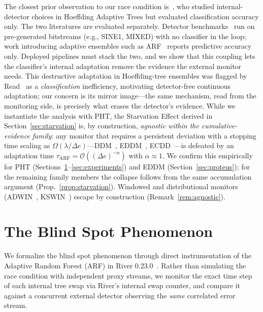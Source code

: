 \documentclass[10pt,conference]{IEEEtran}
\theoremstyle{definition}
\begin{document}
The closest prior observation to our race condition is~\cite{stirling_2018}, who studied internal-detector choices in Hoeffding Adaptive Trees but evaluated classification accuracy only.
The two literatures are evaluated separately. Detector benchmarks~\cite{goncalves_2014, lukats_2025} run on pre-generated bitstreams (e.g., SINE1, MIXED) with no classifier in the loop; work introducing adaptive ensembles such as ARF~\cite{gomes_arf_2017} reports predictive accuracy only. Deployed pipelines must stack the two, and we show that this coupling lets the classifier's internal adaptation remove the evidence the external monitor needs. This destructive adaptation in Hoeffding-tree ensembles was flagged by Read~\cite{read_2018} as a \emph{classification} inefficiency, motivating detector-free continuous adaptation; our concern is its mirror image---the same mechanism, read from the monitoring side, is precisely what erases the detector's evidence. While we instantiate the analysis with PHT, the Starvation Effect derived in Section~\ref{sec:starvation} is, by construction, \emph{agnostic within the cumulative-evidence family}: any monitor that requires a persistent deviation with a stopping time scaling as $\Omega(\lambda / \Delta e)$---DDM~\cite{gama_ddm_2004}, EDDM~\cite{baena_eddm_2006}, ECDD~\cite{ross_ecdd_2012}---is defeated by an adaptation time $\tau_{\mathrm{ARF}} = \mathcal{O}((\Delta e)^{-\alpha})$ with $\alpha \approx 1$. We confirm this empirically for PHT (Sections~\ref{sec:blindspot}--\ref{sec:experiments}) and EDDM (Section~\ref{sec:proteus}); for the remaining family members the collapse follows from the same accumulation argument (Prop.~\ref{prop:starvation}). Windowed and distributional monitors (ADWIN~\cite{bifet_adwin_2007}, KSWIN~\cite{raab_kswin_2020}) escape by construction (Remark~\ref{rem:agnostic}).

\section{The Blind Spot Phenomenon}\label{sec:blindspot}

We formalize the blind spot phenomenon through direct instrumentation of the Adaptive Random Forest (ARF) in River 0.23.0~\cite{montiel_river_2021}.
Rather than simulating the race condition with independent proxy streams, we monitor the exact time step of each internal tree swap via River's internal swap counter, and compare it against a concurrent external detector observing the \emph{same} correlated error stream.
\end{document}
